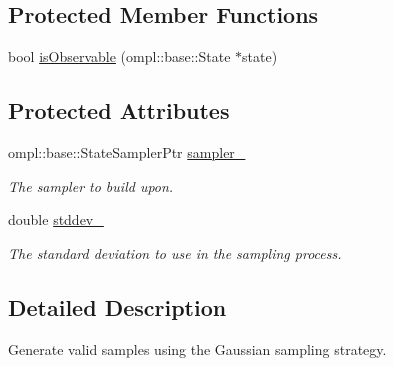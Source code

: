 \subsection*{\-Protected \-Member \-Functions}
\begin{DoxyCompactItemize}
\item 
bool \hyperlink{class_gaussian_valid_belief_sampler_a87de26ec14b44eb5946d6c27b06416c6}{is\-Observable} (ompl\-::base\-::\-State $\ast$state)
\end{DoxyCompactItemize}
\subsection*{\-Protected \-Attributes}
\begin{DoxyCompactItemize}
\item 
\hypertarget{class_gaussian_valid_belief_sampler_ac479e9335daee424ce105648b068a018}{ompl\-::base\-::\-State\-Sampler\-Ptr \hyperlink{class_gaussian_valid_belief_sampler_ac479e9335daee424ce105648b068a018}{sampler\-\_\-}}\label{class_gaussian_valid_belief_sampler_ac479e9335daee424ce105648b068a018}

\begin{DoxyCompactList}\small\item\em \-The sampler to build upon. \end{DoxyCompactList}\item 
\hypertarget{class_gaussian_valid_belief_sampler_a46c46db4485e69a1c6ba5c65e175a8d3}{double \hyperlink{class_gaussian_valid_belief_sampler_a46c46db4485e69a1c6ba5c65e175a8d3}{stddev\-\_\-}}\label{class_gaussian_valid_belief_sampler_a46c46db4485e69a1c6ba5c65e175a8d3}

\begin{DoxyCompactList}\small\item\em \-The standard deviation to use in the sampling process. \end{DoxyCompactList}\end{DoxyCompactItemize}


\subsection{\-Detailed \-Description}
\-Generate valid samples using the \-Gaussian sampling strategy. 

